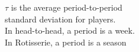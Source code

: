 \documentclass[preview]{standalone}
\begin{document}
\begin{center}
$ \tau$ is the average period-to-period \\ standard deviation for players. \\In head-to-head, a period is a week. \\In Rotisserie, a period is a season
\end{center}
\end{document}
